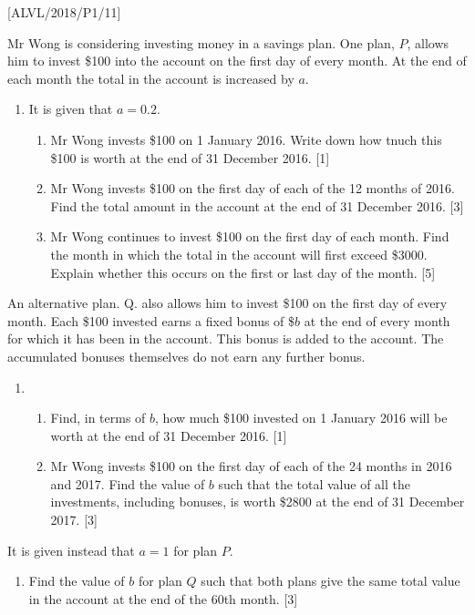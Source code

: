 \item {[}ALVL/2018/P1/11{]}

Mr Wong is considering investing money in a savings plan. One plan,
$P$, allows him to invest \$100 into the account on the first day
of every month. At the end of each month the total in the account
is increased by $a%
$. 
\begin{enumerate}
\item It is given that $a=0.2$.
\begin{enumerate}
\item Mr Wong invests \$100 on 1 January 2016. Write down how tnuch this
\$100 is worth at the end of 31 December 2016. \hfill{}{[}1{]}
\item Mr Wong invests \$100 on the first day of each of the 12 months of
2016. Find the total amount in the account at the end of 31 December
2016. \hfill{}{[}3{]}
\item Mr Wong continues to invest \$100 on the first day of each month.
Find the month in which the total in the account will first exceed
\$3000. Explain whether this occurs on the first or last day of the
month. \hfill{}{[}5{]}
\end{enumerate}
\end{enumerate}
An alternative plan. Q. also allows him to invest \$100 on the first
day of every month. Each \$100 invested earns a fixed bonus of \$$b$
at the end of every month for which it has been in the account. This
bonus is added to the account. The accumulated bonuses themselves
do not earn any further bonus. 
\begin{enumerate}
\item {}
\begin{enumerate}
\item Find, in terms of $b$, how much \$100 invested on 1 January 2016
will be worth at the end of 31 December 2016. \hfill{}{[}1{]}
\item Mr Wong invests \$100 on the first day of each of the 24 months in
2016 and 2017. Find the value of $b$ such that the total value of
all the investments, including bonuses, is worth \$2800 at the end
of 31 December 2017. \hfill{}{[}3{]}
\end{enumerate}
\end{enumerate}
It is given instead that $a=1$ for plan $P$.
\begin{enumerate}
\item Find the value of $b$ for plan $Q$ such that both plans give the
same total value in the account at the end of the 60th month.\hfill{}
{[}3{]}
\end{enumerate}
